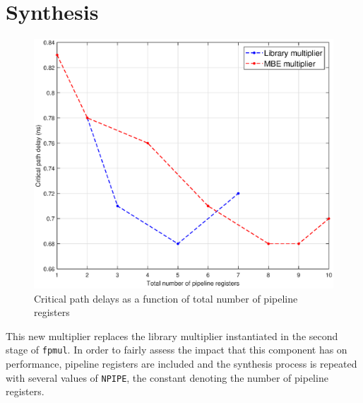 \section{Synthesis}
\begin{figure}
	\includegraphics[width=\textwidth]{chapter2/images/delays.eps}
	\caption{Critical path delays as a function of total number of pipeline registers}
	\label{fig:delays}
\end{figure}
This new multiplier replaces the library multiplier instantiated in the second stage of \texttt{fpmul}. In order to fairly assess the impact that this component has on performance, pipeline registers are included and the synthesis process is repeated with several values of \texttt{NPIPE}, the constant denoting the number of pipeline registers.
\begin{table}[htbp]
\caption{Characterization of the MBE multiplier}
\label{tab:MBE}
\end{table}

